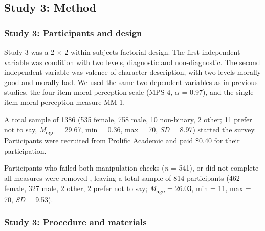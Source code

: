 \documentclass[
  man,floatsintext]{apa6}
\begin{document}
\subsection{Study 3: Method}\label{study-3-method}

\subsubsection{Study 3: Participants and design}\label{study-3-participants-and-design}

Study 3 was a 2 \(\times\) 2 within-subjects factorial design. The first independent variable was condition with two levels, diagnostic and non-diagnostic. The second independent variable was valence of character description, with two levels morally good and morally bad. We used the same two dependent variables as in previous studies, the four item moral perception scale (MPS-4, \(\alpha\) = 0.97), and the single item moral perception measure MM-1.

A total sample of 1386 (535 female, 758 male, 10 non-binary, 2 other; 11 prefer not to say, \emph{M}\textsubscript{age} = 29.67, min = 0.36, max = 70, \emph{SD} = 8.97) started the survey. Participants were recruited from Prolific Academic and paid \$0.40 for their participation.

Participants who failed both manipulation checks (\emph{n} = 541), or did not complete all measures were removed , leaving a total sample of 814 participants (462 female, 327 male, 2 other, 2 prefer not to say; \emph{M}\textsubscript{age} = 26.03, min = 11, max = 70, \emph{SD} = 9.53).

\subsubsection{Study 3: Procedure and materials}\label{study-3-procedure-and-materials}
\end{document}
